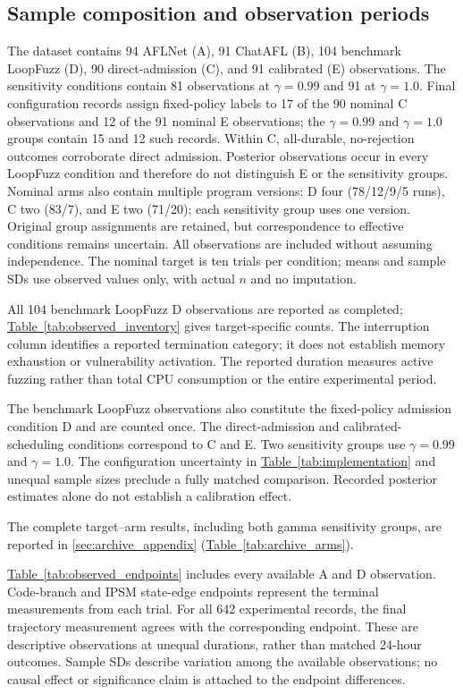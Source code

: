 \documentclass[final,5p,times,number]{elsarticle}
\newcommand{\namedref}[2]{\hyperref[#2]{#1~\ref*{#2}}}
\begin{document}
\subsection{Sample composition and observation periods}
The dataset contains 94 AFLNet (A), 91 ChatAFL (B), 104 benchmark LoopFuzz (D), 90 direct-admission (C), and 91 calibrated (E) observations. The sensitivity conditions contain 81 observations at $\gamma=0.99$ and 91 at $\gamma=1.0$. Final configuration records assign fixed-policy labels to 17 of the 90 nominal C observations and 12 of the 91 nominal E observations; the $\gamma=0.99$ and $\gamma=1.0$ groups contain 15 and 12 such records. Within C, all-durable, no-rejection outcomes corroborate direct admission. Posterior observations occur in every LoopFuzz condition and therefore do not distinguish E or the sensitivity groups. Nominal arms also contain multiple program versions: D four (78/12/9/5 runs), C two (83/7), and E two (71/20); each sensitivity group uses one version. Original group assignments are retained, but correspondence to effective conditions remains uncertain. All observations are included without assuming independence. The nominal target is ten trials per condition; means and sample SDs use observed values only, with actual $n$ and no imputation.

All 104 benchmark LoopFuzz D observations are reported as completed; \namedref{Table}{tab:observed_inventory} gives target-specific counts. The interruption column identifies a reported termination category; it does not establish memory exhaustion or vulnerability activation. The reported duration measures active fuzzing rather than total CPU consumption or the entire experimental period.

The benchmark LoopFuzz observations also constitute the fixed-policy admission condition D and are counted once. The direct-admission and calibrated-scheduling conditions correspond to C and E. Two sensitivity groups use $\gamma=0.99$ and $\gamma=1.0$. The configuration uncertainty in \namedref{Table}{tab:implementation} and unequal sample sizes preclude a fully matched comparison. Recorded posterior estimates alone do not establish a calibration effect.


The complete target--arm results, including both gamma sensitivity groups, are reported in \ref{sec:archive_appendix} (\namedref{Table}{tab:archive_arms}).

\namedref{Table}{tab:observed_endpoints} includes every available A and D observation. Code-branch and IPSM state-edge endpoints represent the terminal measurements from each trial. For all 642 experimental records, the final trajectory measurement agrees with the corresponding endpoint. These are descriptive observations at unequal durations, rather than matched 24-hour outcomes. Sample SDs describe variation among the available observations; no causal effect or significance claim is attached to the endpoint differences.
\end{document}
